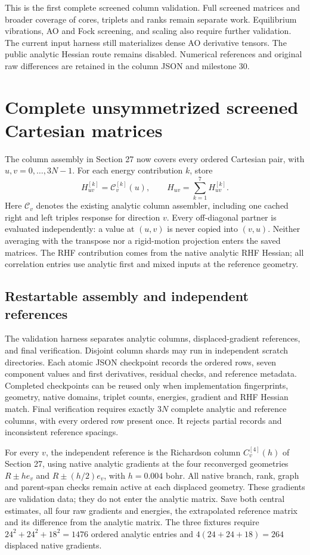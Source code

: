 \documentclass[11pt]{article}
\begin{document}
This is the first complete screened column validation. Full screened
matrices and broader coverage of cores, triplets and ranks remain separate
work. Equilibrium vibrations, AO and Fock screening, and scaling also
require further validation.
The current input harness still materializes dense AO derivative tensors.
The public analytic Hessian route remains disabled. Numerical references
and original raw differences are retained in the column JSON and milestone 30.

\section{Complete unsymmetrized screened Cartesian matrices}
\label{sec:screened-matrices}
The column assembly in Section 27 now covers every ordered Cartesian
pair, with $u,v=0,\ldots,3N-1$. For each energy contribution $k$, store
\begin{equation}
 H^{[k]}_{uv}=\mathcal C^{[k]}_v(u),\qquad
 H_{uv}=\sum_{k=1}^{7}H^{[k]}_{uv}.
\end{equation}
Here $\mathcal C_v$ denotes the existing analytic column assembler,
including one cached right and left triples response for direction $v$.
Every off-diagonal partner is evaluated independently: a value at $(u,v)$
is never copied into $(v,u)$. Neither averaging with the transpose nor a
rigid-motion projection enters the saved matrices. The RHF contribution
comes from the native analytic RHF Hessian; all correlation entries use
analytic first and mixed inputs at the reference geometry.

\subsection{Restartable assembly and independent references}
The validation harness separates analytic columns, displaced-gradient
references, and final verification. Disjoint column shards may run in
independent scratch directories. Each atomic JSON checkpoint records the
ordered rows, seven component values and first derivatives, residual
checks, and reference metadata. Completed checkpoints can be reused only
when implementation fingerprints, geometry, native domains, triplet
counts, energies, gradient and RHF Hessian match. Final verification
requires exactly $3N$ complete analytic and reference columns, with every
ordered row present once. It rejects partial records and inconsistent
reference spacings.

For every $v$, the independent reference is the Richardson column
$C_v^{[4]}(h)$ of Section 27, using native analytic gradients at the four
reconverged geometries $R\pm h e_v$ and $R\pm(h/2)e_v$, with
$h=0.004$ bohr. All native branch, rank, graph and parent-span checks remain
active at each displaced geometry. These gradients are validation data;
they do not enter the analytic matrix. Save both central estimates, all
four raw gradients and energies, the extrapolated reference matrix and
its difference from the analytic matrix. The three fixtures require
$24^2+24^2+18^2=1476$ ordered analytic entries and $4(24+24+18)=264$
displaced native gradients.
\end{document}
